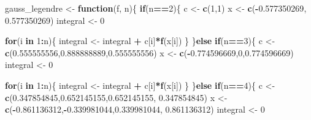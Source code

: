 \documentclass[]{book}
\newenvironment{Shaded}{\begin{snugshade}}{\end{snugshade}}
\newcommand{\ControlFlowTok}[1]{\textcolor[rgb]{0.13,0.29,0.53}{\textbf{#1}}}
\newcommand{\DecValTok}[1]{\textcolor[rgb]{0.00,0.00,0.81}{#1}}
\newcommand{\FloatTok}[1]{\textcolor[rgb]{0.00,0.00,0.81}{#1}}
\newcommand{\KeywordTok}[1]{\textcolor[rgb]{0.13,0.29,0.53}{\textbf{#1}}}
\newcommand{\NormalTok}[1]{#1}
\newcommand{\OperatorTok}[1]{\textcolor[rgb]{0.81,0.36,0.00}{\textbf{#1}}}
\newcommand{\StringTok}[1]{\textcolor[rgb]{0.31,0.60,0.02}{#1}}
\theoremstyle{definition}
\theoremstyle{definition}
\theoremstyle{definition}
\theoremstyle{remark}
\begin{document}
\begin{Shaded}
\begin{Highlighting}[]
\NormalTok{gauss_legendre <-}\StringTok{ }\ControlFlowTok{function}\NormalTok{(f, n)\{}
    \ControlFlowTok{if}\NormalTok{(n}\OperatorTok{==}\DecValTok{2}\NormalTok{)\{}
\NormalTok{      c <-}\StringTok{ }\KeywordTok{c}\NormalTok{(}\DecValTok{1}\NormalTok{,}\DecValTok{1}\NormalTok{)}
\NormalTok{      x <-}\StringTok{ }\KeywordTok{c}\NormalTok{(}\OperatorTok{-}\FloatTok{0.577350269}\NormalTok{, }\FloatTok{0.577350269}\NormalTok{)}
\NormalTok{      integral <-}\StringTok{ }\DecValTok{0}
      
      \ControlFlowTok{for}\NormalTok{(i }\ControlFlowTok{in} \DecValTok{1}\OperatorTok{:}\NormalTok{n)\{}
\NormalTok{        integral <-}\StringTok{ }\NormalTok{integral }\OperatorTok{+}\StringTok{ }\NormalTok{c[i]}\OperatorTok{*}\KeywordTok{f}\NormalTok{(x[i])}
\NormalTok{      \}}
\NormalTok{    \}}\ControlFlowTok{else} \ControlFlowTok{if}\NormalTok{(n}\OperatorTok{==}\DecValTok{3}\NormalTok{)\{}
\NormalTok{      c <-}\StringTok{ }\KeywordTok{c}\NormalTok{(}\FloatTok{0.555555556}\NormalTok{,}\FloatTok{0.888888889}\NormalTok{,}\FloatTok{0.555555556}\NormalTok{)}
\NormalTok{      x <-}\StringTok{ }\KeywordTok{c}\NormalTok{(}\OperatorTok{-}\FloatTok{0.774596669}\NormalTok{,}\DecValTok{0}\NormalTok{,}\FloatTok{0.774596669}\NormalTok{)}
\NormalTok{      integral <-}\StringTok{ }\DecValTok{0}
      
      \ControlFlowTok{for}\NormalTok{(i }\ControlFlowTok{in} \DecValTok{1}\OperatorTok{:}\NormalTok{n)\{}
\NormalTok{        integral <-}\StringTok{ }\NormalTok{integral }\OperatorTok{+}\StringTok{ }\NormalTok{c[i]}\OperatorTok{*}\KeywordTok{f}\NormalTok{(x[i])}
\NormalTok{      \}}
\NormalTok{    \}}\ControlFlowTok{else} \ControlFlowTok{if}\NormalTok{(n}\OperatorTok{==}\DecValTok{4}\NormalTok{)\{}
\NormalTok{      c <-}\StringTok{ }\KeywordTok{c}\NormalTok{(}\FloatTok{0.347854845}\NormalTok{,}\FloatTok{0.652145155}\NormalTok{,}\FloatTok{0.652145155}\NormalTok{,}
             \FloatTok{0.347854845}\NormalTok{)}
\NormalTok{      x <-}\StringTok{ }\KeywordTok{c}\NormalTok{(}\OperatorTok{-}\FloatTok{0.861136312}\NormalTok{,}\OperatorTok{-}\FloatTok{0.339981044}\NormalTok{,}\FloatTok{0.339981044}\NormalTok{,}
             \FloatTok{0.861136312}\NormalTok{)}
\NormalTok{      integral <-}\StringTok{ }\DecValTok{0}
      

\end{Highlighting}
\end{Shaded}
\end{document}
